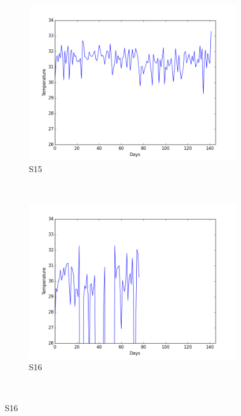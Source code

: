\documentclass[12pt]{article} %
\begin{document}
\begin{figure}[H]
    \begin{subfigure}[b]{0.30\textwidth}
        \includegraphics[width=\textwidth]{img/graphs/15-skintemp-1}
        \caption{S15}
        \label{fig:s15ST}
    \end{subfigure}
    ~ %
    \begin{subfigure}[b]{0.30\textwidth}
        \includegraphics[width=\textwidth]{img/graphs/16-skintemp-1}
        \caption{S16}
        \label{fig:s16ST}
    \end{subfigure}
    ~ %

\end{figure}
\end{document}
